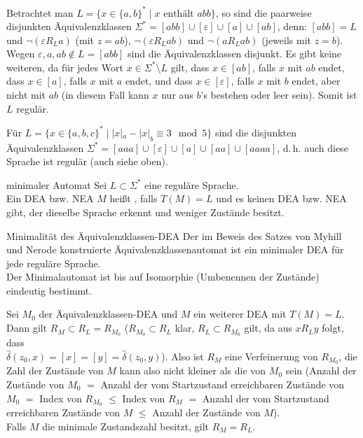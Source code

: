 \begin{Bsp}
    Betrachtet man $L = \{x \in \{a, b\}^\ast \;|\; x \text{ enthält } abb\}$,
    so sind die paarweise disjunkten Äquivalenzklassen
    $\Sigma^\ast = [abb] \cup [\varepsilon] \cup [a] \cup [ab]$, denn:
    $[abb] = L$ und
    $\lnot (\varepsilon R_L a)$ (mit $z = ab$),
    $\lnot (\varepsilon R_L ab)$ und
    $\lnot (a R_L ab)$ (jeweils mit $z = b$).
    Wegen $\varepsilon, a, ab \notin L = [abb]$ sind die Äquivalenzklassen
    disjunkt.
    Es gibt keine weiteren, da für jedes Wort
    $x \in \Sigma^\ast \setminus L$ gilt,
    dass $x \in [ab]$, falls $x$ mit $ab$ endet,
    dass $x \in [a]$, falls $x$ mit $a$ endet, und
    dass $x \in [\varepsilon]$, falls $x$ mit $b$ endet, aber nicht mit $ab$
    (in diesem Fall kann $x$ nur aus $b$'s bestehen oder leer sein).
    Somit ist $L$ regulär.
\end{Bsp}

\begin{Bsp}
    Für $L = \{x \in \{a, b, c\}^\ast \;|\; |x|_a - |x|_b \equiv 3 \mod 5\}$
    sind die disjunkten Äquivalenzklassen
    $\Sigma^\ast = [aaa] \cup [\varepsilon] \cup [a] \cup [aa] \cup [aaaa]$,
    d.\,h. auch diese Sprache ist regulär
    (auch siehe oben).
\end{Bsp}

\linie
\pagebreak

\begin{Def}{minimaler Automat}
    Sei $L \subset \Sigma^\ast$ eine reguläre Sprache.\\
    Ein DEA bzw. NEA $M$ heißt , falls
    $T(M) = L$ und es keinen DEA bzw. NEA gibt, der dieselbe Sprache erkennt
    und weniger Zustände besitzt.
\end{Def}

\begin{Satz}{Minimalität des Äquivalenzklassen-DEA}
    Der im Beweis des Satzes von Myhill und Nerode konstruierte
    Äquivalenzklassenautomat ist ein
    minimaler DEA für jede reguläre Sprache.\\
    Der Minimalautomat ist bis auf Isomorphie (Umbenennen der Zustände)
    eindeutig bestimmt.
\end{Satz}

\begin{Beweis}
    Sei $M_0$ der Äquivalenzklassen-DEA und $M$ ein weiterer DEA mit
    $T(M) = L$.\\
    Dann gilt $R_M \subset R_L = R_{M_0}$
    ($R_{M_0} \subset R_L$ klar,
    $R_L \subset R_{M_0}$ gilt, da aus $x R_L y$ folgt, dass\\
    $\widehat{\delta}(z_0, x) =
    [x] = [y] = \widehat{\delta}(z_0, y)$).
    Also ist $R_M$ eine Verfeinerung von $R_{M_0}$, die Zahl der Zustände
    von $M$ kann also nicht kleiner als die von $M_0$ sein
    (Anzahl der Zustände von $M_0$
    $=$ Anzahl der vom Startzustand erreichbaren Zustände von $M_0$
    $=$ Index von $R_{M_0}$ $\le$ Index von $R_M$
    $=$ Anzahl der vom Startzustand erreichbaren Zustände von $M$
    $\le$ Anzahl der Zustände von $M$).\\
    Falls $M$ die minimale Zustandszahl besitzt, gilt $R_M = R_L$.
\end{Beweis}


